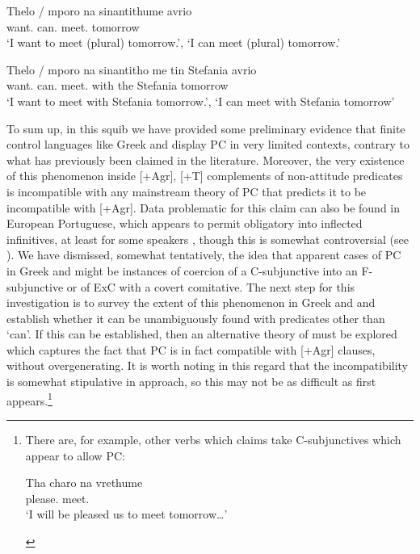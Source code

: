 \documentclass[output=paper]{langsci/langscibook}
\begin{document}
\ea%
    \label{ex:key:24.54}
    \sn
	\gll Thelo / mporo    na   sinantithume   avrio\\
        want.\Fsg{} {} can.\Fsg{}  \Sbjv{}   meet.\Fsg{}   tomorrow\\
	\glt ‘I want to meet (plural) tomorrow.’, ‘I can meet (plural) tomorrow.’
\z

\ea%
    \label{ex:key:24.55}
    \sn
	\gll Thelo  / mporo   na   sinantitho   me tin Stefania   avrio\\
    want.\Fsg{} {}  can.\Fsg{} \Sbjv{}  meet.\Fsg{}   with the Stefania   tomorrow\\
	\glt ‘I want to meet with Stefania tomorrow.’, ‘I can meet with Stefania tomorrow’
\z

\largerpage[-2]
To sum up, in this squib we have provided some preliminary evidence that finite
control languages like Greek and  display \gls{PC} in very limited contexts, contrary to what has previously been claimed
in the literature. Moreover, the very existence of this phenomenon inside
[+Agr], [+T] complements of non-attitude predicates is incompatible with any
mainstream theory of \gls{PC} that predicts it to
be incompatible with [+Agr]. Data problematic for this claim can also be found
in European Portuguese, which appears to permit obligatory  into
inflected infinitives, at least for some speakers
\parencite{Sheehan2018a,Sheehan2018b},
though this is somewhat controversial (see \citealt{Barbosa2017}). We have
dismissed, somewhat tentatively, the idea that apparent cases of
\gls{PC} in Greek and  might be instances
of coercion of a C-subjunctive into an F-subjunctive or of
\gls{ExC} with a covert comitative. The next
step for this investigation is to survey the extent of this phenomenon in Greek
and  and establish whether it can be unambiguously found with
predicates other than ‘can’. If this can be established, then an alternative
theory of  must be explored which captures the fact that
\gls{PC} is in fact compatible with [+Agr] clauses,
without overgenerating. It is worth noting in this regard that the
incompatibility is somewhat stipulative in  approach, so
this may not be as difficult as first appears.\footnote{There are, for example,
    other verbs which \citeauthor{Varlokosta1994} claims take C-subjunctives
    which appear to allow \gls{PC}:

\begin{exe}
     
    \sn
    \gll Tha charo     na   vrethume \\
    \Fut{} please.\Fsg{}   \Sbjv{} meet.\Fpl{}\\
    \glt ‘I will be pleased us to meet tomorrow\dots{}’
\end{exe}}

\printchapterglossary{}

{\sloppy
\printbibliography[heading=subbibliography,notkeyword=this]
}
\end{document}
